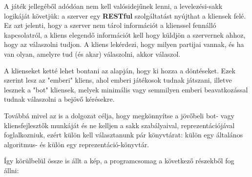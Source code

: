 \documentclass[twoside, a4paper, 12pt]{article}
\begin{document}
A játék jellegéből adódóan nem kell valósidejűnek lenni, a levelezési-sakk logikáját követjük: a szerver egy \textbf{RESTful} szolgáltatást nyújthat a kliensek felé. Ez azt jelenti, hogy a szerver nem tárol információt a klienssel fennálló kapcsolatról, a kliens elegendő információt kell hogy küldjön a szervernek ahhoz, hogy az válaszolni tudjon. A kliens lekérdezi, hogy milyen partijai vannak, és ha van olyan, amelyre tud (és akar) válaszolni, akkor válaszol.

A klienseket ketté lehet bontani az alapján, hogy ki hozza a döntéseket. Ezek szerint lesz az "emberi" kliens, ahol emberi játékosok tudnak játszani, illetve lesznek a "bot" kliensek, melyek minimális vagy semmilyen emberi beavatkozással tudnak válaszolni a bejövő kérésekre.

Továbbá mivel az is a dolgozat célja, hogy megkönnyítse a jövőbeli bot- vagy kliensfejlesztők munkáját és ne kelljen a sakk szabályaival, reprezentációjával foglalkozniuk, ezért külön kell választanunk pár könyvtárat: külön egy általános algoritmus- és külön egy reprezentáció-könyvtár.

Így körülbelül össze is állt a kép, a programcsomag a következő részekből fog állni:
\end{document}
